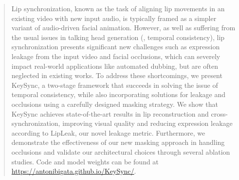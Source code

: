 \begin{abstract}
Lip synchronization, known as the task of aligning lip movements in an existing video with new input audio, is typically framed as a simpler variant of audio-driven facial animation. However, as well as suffering from the usual issues in talking head generation (\eg, temporal consistency), lip synchronization presents significant new challenges such as expression leakage from the input video and facial occlusions, which can severely impact real-world applications like automated dubbing, but are often neglected in existing works. To address these shortcomings, we present KeySync, a two-stage framework that succeeds in solving the issue of temporal consistency, while also incorporating solutions for leakage and occlusions using a carefully designed masking strategy. We show that KeySync achieves state-of-the-art results in lip reconstruction and cross-synchronization, improving visual quality and reducing expression leakage according to LipLeak, our novel leakage metric. Furthermore, we demonstrate the effectiveness of our new masking approach in handling occlusions and validate our architectural choices through several ablation studies. Code and model weights can be found at \href{https://antonibigata.github.io/KeySync/}{https://antonibigata.github.io/KeySync/}.
\end{abstract}